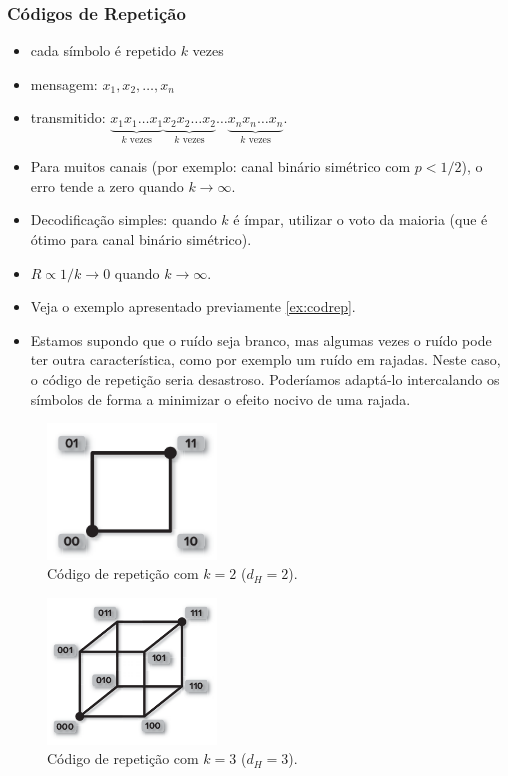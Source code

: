 \begin{frame}[allowframebreaks]
  \frametitle{Códigos de Repetição}
  \begin{itemize}
  \item cada símbolo é repetido $k$ vezes
  \item mensagem: $x_1, x_2, \ldots, x_n$
  \item transmitido: $\underbrace{x_1 x_1 \ldots x_1}_{k \text{ vezes}} \underbrace{x_2 x_2 \ldots x_2}_{k \text{ vezes}} \ldots \underbrace{x_n x_n \ldots x_n}_{k \text{ vezes}}$.
  \item Para muitos canais (por exemplo: canal binário simétrico com $p<1/2$), o erro tende a zero quando $k \rightarrow \infty$.
  \item Decodificação simples: quando $k$ é ímpar, utilizar o voto da maioria (que é ótimo para canal binário simétrico).
  \item $R \propto 1/k \rightarrow 0$ quando $k \rightarrow \infty$.
  \item Veja o exemplo apresentado previamente \ref{ex:codrep}.
  \item Estamos supondo que o ruído seja branco, mas algumas vezes o ruído pode ter
	outra característica, como por exemplo um ruído em rajadas. Neste caso,
	o código de repetição seria desastroso. Poderíamos adaptá-lo intercalando 
	os símbolos de forma a minimizar o efeito nocivo de uma rajada.
  \end{itemize}

                \begin{figure}[h!]
                \centering
                \includegraphics[width=0.4\textwidth]{images/repeatingcode2.png}
		\caption{Código de repetição com $k=2$ ($d_H = 2$).}
                \label{fig:repeatingcode2}
                \end{figure}


                \begin{figure}[h!]
                \centering
                \includegraphics[width=0.4\textwidth]{images/repeatingcode3.png}
		\caption{Código de repetição com $k=3$ ($d_H = 3$).}
                \label{fig:repeatingcode3}
                \end{figure}


\end{frame}
